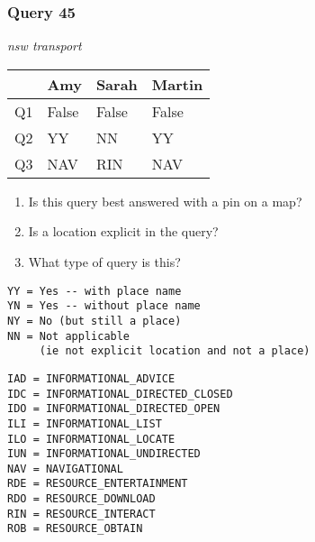 \begin{frame}[fragile]
\frametitle{Query 45}
\vspace{1em}

\emph{nsw transport}

\vfill

\begin{table}
  \centering
  \begin{tabular}{ l l l l }
    & \textbf{Amy} & \textbf{Sarah} & \textbf{Martin}\\
    \toprule
    Q1 & False & False & False\\
Q2 & YY & NN & YY\\
Q3 & NAV & RIN & NAV\\
    \bottomrule
  \end{tabular}
\end{table}

\vfill

\tiny{

\begin{enumerate}
\item Is this query best answered with a pin on a map?
\item Is a location explicit in the query?
\item What type of query is this?
\end{enumerate}

\vfill

\begin{multicols}{2}
\begin{verbatim}
YY = Yes -- with place name
YN = Yes -- without place name
NY = No (but still a place)
NN = Not applicable 
     (ie not explicit location and not a place)
\end{verbatim}

\columnbreak
\begin{verbatim}
IAD = INFORMATIONAL_ADVICE
IDC = INFORMATIONAL_DIRECTED_CLOSED
IDO = INFORMATIONAL_DIRECTED_OPEN
ILI = INFORMATIONAL_LIST
ILO = INFORMATIONAL_LOCATE
IUN = INFORMATIONAL_UNDIRECTED
NAV = NAVIGATIONAL
RDE = RESOURCE_ENTERTAINMENT
RDO = RESOURCE_DOWNLOAD
RIN = RESOURCE_INTERACT
ROB = RESOURCE_OBTAIN
\end{verbatim}
\end{multicols}
}

\end{frame}


